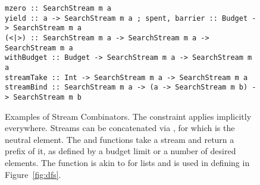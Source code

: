 \begin{figure}
\begin{lcodebox}
\begin{lstlisting}[style=haskell]
mzero :: SearchStream m a
yield :: a -> SearchStream m a ; spent, barrier :: Budget -> SearchStream m a
(<|>) :: SearchStream m a -> SearchStream m a -> SearchStream m a
withBudget :: Budget -> SearchStream m a -> SearchStream m a
streamTake :: Int -> SearchStream m a -> SearchStream m a
streamBind :: SearchStream m a -> (a -> SearchStream m b) -> SearchStream m b
\end{lstlisting}
\end{lcodebox}
\vspace{-0.3cm}
\caption{Examples of Stream Combinators. The  constraint applies implicitly everywhere. Streams can be concatenated via \code{<|>}, for which  is the neutral element. The  and  functions take a stream and return a prefix of it, as defined by a budget limit or a number of desired elements. The  function is akin to  for lists and is used in defining  in Figure~\ref{fig:dfs}.}\label{fig:stream-combinators}
\end{figure}
